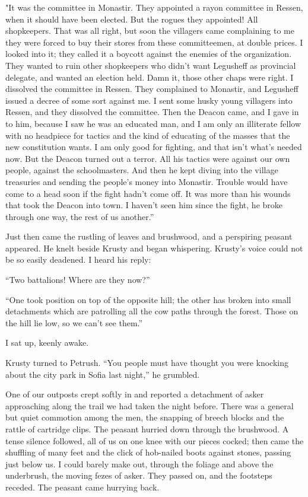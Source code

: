 \documentclass[a5paper,12pt]{book}
\begin{document}
"It was the committee in Monastir. They appointed a rayon committee in Ressen, when it should have been elected. But the rogues they appointed! All shopkeepers. That was all right, but soon the villagers came complaining to me they were forced to buy their stores from these committeemen, at double prices. I looked into it; they called it a boycott against the enemies of the organization. They wanted to ruin other shopkeepers who didn’t want Legusheff as provincial delegate, and wanted an election held. Damn it, those other chaps were right. I dissolved the committee in Ressen. They complained to Monastir, and Legusheff issued a decree of some sort against me. I sent some husky young villagers into Ressen, and they dissolved the committee. Then the Deacon came, and I gave in to him, because I saw he was an educated man, and I am only an illiterate fellow with no headpiece for tactics and the kind of educating of the masses that the new constitution wants. I am only good for fighting, and that isn’t what’s needed now. But the Deacon turned out a terror. All his tactics were against our own people, against the schoolmasters. And then he kept diving into the village treasuries and sending the people’s money into Monastir. Trouble would have come to a head soon if the fight hadn’t come off. It was more than his wounds that took the Deacon into town. I haven’t seen him since the fight, he broke through one way, the rest of us another.”

Just then came the rustling of leaves and brushwood, and a perspiring peasant appeared. He knelt beside Krusty and began whispering. Krusty’s voice could not be so easily deadened. I heard his reply:

“Two battalions! Where are they now?”

“One took position on top of the opposite hill; the other has broken into small detachments which are patrolling all the cow paths through the forest. Those on the hill lie low, so we can’t see them.”

I sat up, keenly awake.

Krusty turned to Petrush. “You people must have thought you were knocking about the city park in Sofia last night,” he grumbled.

One of our outposts crept softly in and reported a detachment of asker approaching along the trail we had taken the night before. There was a general but quiet commotion among the men, the snapping of breech blocks and the rattle of cartridge clips. The peasant hurried down through the brushwood. A tense silence followed, all of us on one knee with our pieces cocked; then came the shuffling of many feet and the click of hob-nailed boots against stones, passing just below us. I could barely make out, through the foliage and above the underbrush, the moving fezes of asker. They passed on, and the footsteps receded. The peasant came hurrying back.
\end{document}
